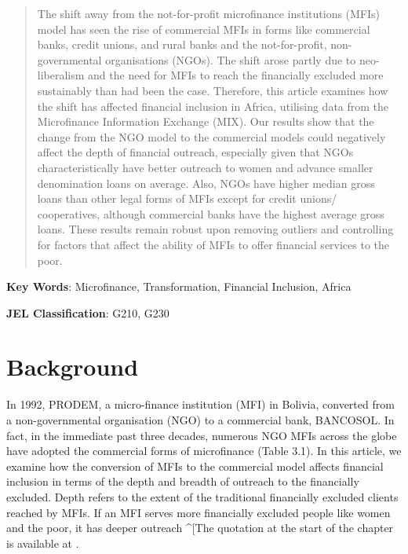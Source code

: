 \documentclass[a4paper, nobind]{templates/ociamthesis}
\begin{document}
\begin{quote}
The shift away from the not-for-profit microfinance institutions (MFIs) model has seen the rise of commercial MFIs in forms like commercial banks, credit unions, and rural banks and the not-for-profit, non-governmental organisations (NGOs). The shift arose partly due to neo-liberalism and the need for MFIs to reach the financially excluded more sustainably than had been the case. Therefore, this article examines how the shift has affected financial inclusion in Africa, utilising data from the Microfinance Information Exchange (MIX). Our results show that the change from the NGO model to the commercial models could negatively affect the depth of financial outreach, especially given that NGOs characteristically have better outreach to women and advance smaller denomination loans on average. Also, NGOs have higher median gross loans than other legal forms of MFIs except for credit unions/ cooperatives, although commercial banks have the highest average gross loans. These results remain robust upon removing outliers and controlling for factors that affect the ability of MFIs to offer financial services to the poor.
\end{quote}

\vspace{10mm}

\textbf{Key Words}: Microfinance, Transformation, Financial Inclusion, Africa

\vspace{5mm}

\textbf{JEL Classification}: G210, G230

\newpage

\newpage

\hypertarget{background-1}{%
\section{Background}\label{background-1}}

In 1992, PRODEM, a micro-finance institution (MFI) in Bolivia, converted from a non-governmental organisation (NGO) to a commercial bank, BANCOSOL. In fact, in the immediate past three decades, numerous NGO MFIs across the globe have adopted the commercial forms of microfinance (Table 3.1). In this article, we examine how the conversion of MFIs to the commercial model affects financial inclusion in terms of the depth and breadth of outreach to the financially excluded. Depth refers to the extent of the traditional financially excluded clients reached by MFIs. If an MFI serves more financially excluded people like women and the poor, it has deeper outreach \^{}{[}The quotation at the start of the chapter is available at \textcite{financialtimesinclusion}.
\end{document}
